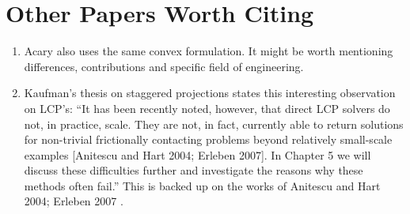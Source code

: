 \section{Other Papers Worth Citing}

\begin{enumerate}
	\item Acary \cite{bib:acary2011formulation} also uses the same convex
	formulation. It might be worth mentioning differences, contributions and
	specific field of engineering.
	\item Kaufman's thesis on staggered projections
	\cite{bib:kaufman2009coupled} states this interesting observation on LCP's:
	``It has been recently noted, however, that direct LCP solvers do not, in
	practice, scale. They are not, in fact, currently able to return solutions
	for non-trivial frictionally contacting problems beyond relatively
	small-scale examples [Anitescu and Hart 2004; Erleben 2007]. In Chapter 5 we
	will discuss these difficulties further and investigate the reasons why
	these methods often fail.'' This is backed up on the works of Anitescu and
	Hart 2004; Erleben 2007 \cite{bib:anitescu2004fixed,bib:erleben2007velocity}.
\end{enumerate}
